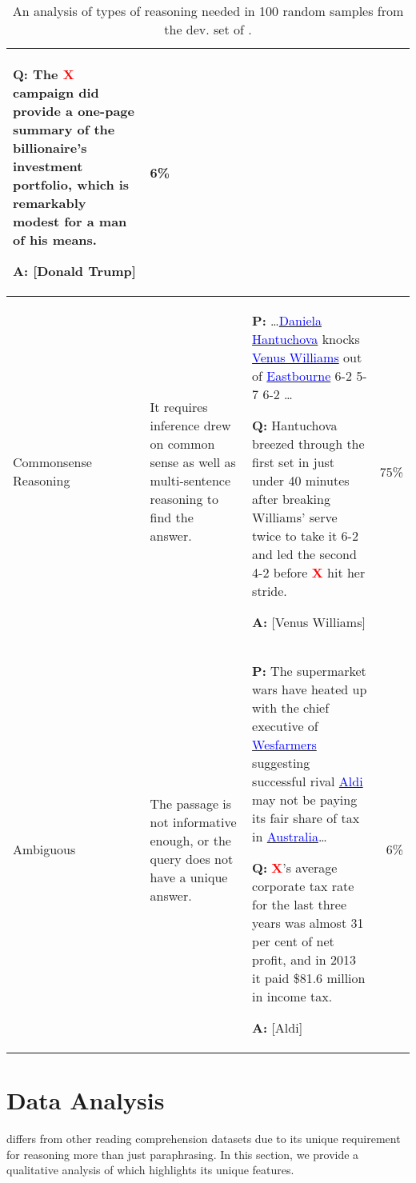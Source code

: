 \begin{table*}[!t]
\begin{tabular}{@{}m{2cm}m{4.8cm}m{7cm}r@{}}
\noindent\textbf{Q:} The \textcolor{red}{$\mathbf{X}$} campaign did provide a one-page summary of the billionaire's investment portfolio, which is remarkably modest for a man of his means.

\noindent\textbf{A:} [Donald Trump]
& 6\%                            \\ \midrule
Commonsense Reasoning        & It requires inference drew on common sense as well as multi-sentence reasoning to find the answer.                                                                                                &         
\noindent\textbf{P:} 
\ldots\underline{\textcolor{blue}{Daniela Hantuchova}} knocks \underline{\textcolor{blue}{Venus Williams}} out of \underline{\textcolor{blue}{Eastbourne}} 6-2 5-7 6-2 \ldots

\noindent\textbf{Q:} Hantuchova breezed through the first set in just under 40 minutes after breaking Williams' serve twice to take it 6-2 and led the second 4-2 before \textcolor{red}{$\mathbf{X}$} hit her stride.

\noindent\textbf{A:} [Venus Williams]
& 75\%                           \\ \midrule
Ambiguous                     & The passage is not informative enough, or the query does not have a unique answer.                                                                                                                                                       &         
\noindent\textbf{P:} The supermarket wars have heated up with the chief executive of \underline{\textcolor{blue}{Wesfarmers}} suggesting successful rival \underline{\textcolor{blue}{Aldi}} may not be paying its fair share of tax in \underline{\textcolor{blue}{Australia}}\ldots

\noindent\textbf{Q:} \textcolor{red}{$\mathbf{X}$}'s average corporate tax rate for the last three years was almost 31 per cent of net profit, and in 2013 it paid \$81.6 million in income tax.

\noindent\textbf{A:} [Aldi]
& 6\%                            \\ \bottomrule
\end{tabular}
\caption{An analysis of types of reasoning needed in 100 random samples from the dev. set of \ReCoRD.}
\label{tab:reason-types}
\end{table*}

\section{Data Analysis}
\label{sec:data-analysis}
\ReCoRD differs from other reading comprehension datasets due to its unique requirement for reasoning more than just paraphrasing.
In this section, we provide a qualitative analysis of \ReCoRD which highlights its unique features.

